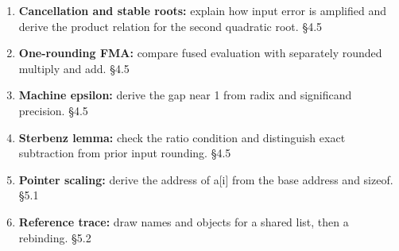 \documentclass[11pt]{article}
\begin{document}
\begin{keepsection}
\begin{enumerate}
\item \textbf{Cancellation and stable roots:} explain how input error is amplified and derive the product relation for the second quadratic root. \hfill{\small\color{FAUblue}§4.5}
\item \textbf{One-rounding FMA:} compare fused evaluation with separately rounded multiply and add. \hfill{\small\color{FAUblue}§4.5}
\item \textbf{Machine epsilon:} derive the gap near 1 from radix and significand precision. \hfill{\small\color{FAUblue}§4.5}
\item \textbf{Sterbenz lemma:} check the ratio condition and distinguish exact subtraction from prior input rounding. \hfill{\small\color{FAUblue}§4.5}
\item \textbf{Pointer scaling:} derive the address of a[i] from the base address and sizeof. \hfill{\small\color{FAUblue}§5.1}
\item \textbf{Reference trace:} draw names and objects for a shared list, then a rebinding. \hfill{\small\color{FAUblue}§5.2}
\end{enumerate}
\end{keepsection}
\end{document}
